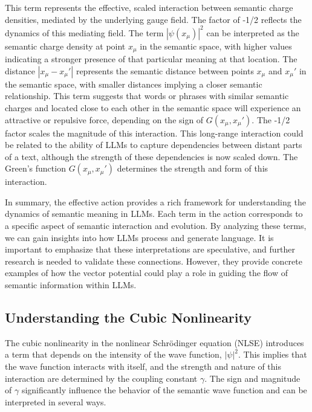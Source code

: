 \documentclass[prd,amsmath,amssymb,12pt]{revtex4}
\begin{document}
\noindent
This term represents the effective, scaled interaction between semantic charge densities, mediated by the
underlying gauge field. The factor of -1/2 reflects the dynamics of this mediating field. The
term $|\psi(x_{\mu})|^2$ can be interpreted as the semantic charge density at point $x_{\mu}$ in the
semantic space, with higher values indicating a stronger presence of that particular meaning at
that location. The distance $|x_{\mu} - x_{\mu}'|$ represents the semantic distance between points
$x_{\mu}$ and $x_{\mu}'$ in the semantic space, with smaller distances implying a closer semantic
relationship. This term suggests that words or phrases with similar semantic charges and located
close to each other in the semantic space will experience an attractive or repulsive force,
depending on the sign of $G(x_{\mu}, x_{\mu}')$. The -1/2 factor scales the magnitude of this interaction.
This long-range interaction could be related to the ability of LLMs to capture dependencies between
distant parts of a text, although the strength of these dependencies is now scaled down. The Green's
function $G(x_{\mu}, x_{\mu}')$ determines the strength and form of this interaction.

In summary, the effective action provides a rich framework for understanding the dynamics of semantic meaning in LLMs.
Each term in the action corresponds to a specific aspect of semantic interaction and evolution. By analyzing these terms,
we can gain insights into how LLMs process and generate language. It is important to emphasize that these
interpretations are speculative, and further research is needed to validate these connections. However,
they provide concrete examples of how the vector potential could play a role in guiding the flow of
semantic information within LLMs.



\subsection{Understanding the Cubic Nonlinearity}

The cubic nonlinearity in the nonlinear Schrödinger equation (NLSE) introduces a term that depends on the
intensity of the wave function, $|\psi|^2$. This implies that the wave function interacts with itself, and the
strength and nature of this interaction are determined by the coupling constant $\gamma$. The sign and
magnitude of $\gamma$ significantly influence the behavior of the semantic wave function and can be
interpreted in several ways.
\end{document}
